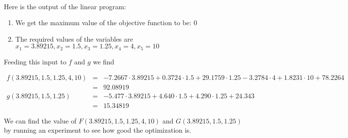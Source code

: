 \documentclass[11pt]{article}
\begin{document}
\paragraph{}
Here is the output of the linear program:
\begin{enumerate}
\item We get the maximum value of the objective function to be: $0$
\item The required values of the variables are $x_1 = 3.89215,x_2 = 1.5,x_3 = 1.25, x_4 = 4, x_5 = 10$
\end{enumerate}

Feeding this input to $f$ and $g$ we find
\begin{tiny}
\begin{eqnarray*}
f(3.89215, 1.5, 1.25, 4,10) &=& -7.2667 \cdot 3.89215 + 0.3724 \cdot 1.5 + 29.1759 \cdot 1.25 - 3.2784 \cdot 4 + 1.8231 \cdot 10 + 78.2264\\
&=& 92.08919\\
g(3.89215, 1.5, 1.25) &=& -5.477 \cdot 3.89215 + 4.640 \cdot 1.5 + 4.290  \cdot 1.25 + 24.343\\
&=& 15.34819
\end{eqnarray*}
\end{tiny}
We can find the value of $F(3.89215, 1.5, 1.25, 4,10)$ and $G(3.89215, 1.5, 1.25)$ by running an experiment to see how good the optimization is.
\end{document}
